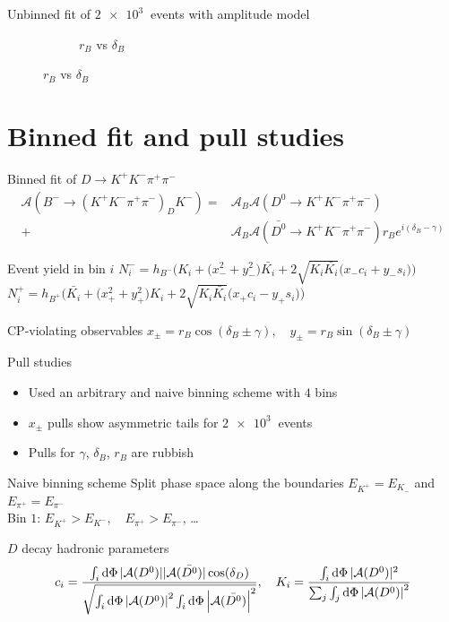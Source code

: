 \documentclass{beamer}
\begin{document}
\begin{frame}{Unbinned fit of $\SI{2e3}{}$ events with amplitude model}
\begin{figure}
\begin{subfigure}{0.46\textwidth}
      \caption{$r_B$ vs $\delta_B$}
    \end{subfigure}
  \end{figure}
\end{frame}

\section{Binned fit and pull studies}
\begin{frame}{Binned fit of $D\to K^+K^-\pi^+\pi^-$}
  \vspace{-0.5cm}
  \begin{align*}
    \mathcal{A}(B^-\to(K^+K^-\pi^+\pi^-)_DK^-) =& \mathcal{A}_B\mathcal{A}(D^0\to K^+K^-\pi^+\pi^-) \\
  +& \mathcal{A}_B\mathcal{A}(\bar{D^0}\to K^+K^-\pi^+\pi^-)r_Be^{i(\delta_B - \gamma)}
  \end{align*}
  \vspace{-0.5cm}
  \begin{block}{Event yield in bin $i$}
    $N^-_i = h_{B^-}\Big(K_i + \big(x_-^2 + y_-^2\big)\bar{K_i} + 2\sqrt{K_i\bar{K_i}}\big(x_-c_i + y_-s_i\big)\Big)$
    $N^+_i = h_{B^+}\Big(\bar{K_i} + \big(x_+^2 + y_+^2\big)K_i + 2\sqrt{K_i\bar{K_i}}\big(x_+c_i - y_+s_i\big)\Big)$
  \end{block}
  \begin{block}{CP-violating observables}
    $x_\pm = r_B\cos(\delta_B\pm\gamma), \quad y_\pm = r_B\sin(\delta_B\pm\gamma)$
  \end{block}
\end{frame}

\begin{frame}{Pull studies}
  \begin{itemize}
    \item{Used an arbitrary and naive binning scheme with $4$ bins}
    \item{$x_\pm$ pulls show asymmetric tails for $\SI{2e3}{}$ events}
    \item{Pulls for $\gamma$, $\delta_B$, $r_B$ are rubbish}
  \end{itemize}
  \begin{block}{Naive binning scheme}
    Split phase space along the boundaries $E_{K^+} = E_{K_-}$ and $E_{\pi^+} = E_{\pi^-}$ \\
    Bin $1$: $E_{K^+} > E_{K^-}, \quad E_{\pi^+} > E_{\pi^-}$, \dots
  \end{block}
  \begin{block}{$D$ decay hadronic parameters}
    \begin{equation*}
      c_i = \frac{\int_i\dd{\Phi}|\mathcal{A}(D^0)||\mathcal{A}(\bar{D^0})|\cos(\delta_D)}{\sqrt{\int_i\dd{\Phi}\abs{\mathcal{A}(D^0)}^2\int_i\dd{\Phi}\abs{\mathcal{A}(\bar{D^0})}^2}}, \quad K_i = \frac{\int_i\dd{\Phi}|\mathcal{A}(D^0)|^2}{\sum_j\int_j\dd{\Phi}\abs{\mathcal{A}(D^0)}^2}
    \end{equation*}
  \end{block}
\end{frame}
\end{document}
